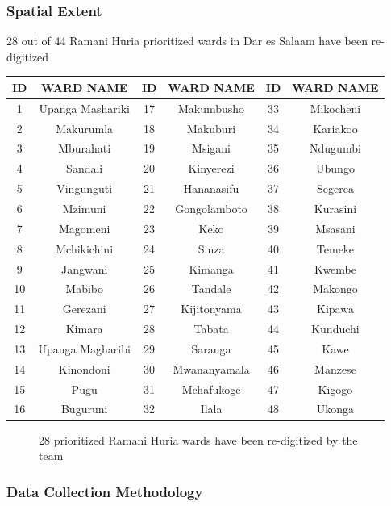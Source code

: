 \documentclass[a4paper,12pt,twoside]{article}
\begin{document}
\subsubsection{Spatial Extent}
28 out of 44 Ramani Huria prioritized wards in Dar es Salaam have been re-digitized

\begin{center}
\begin{tabular}{|c|c|c|c|c|c|}
\hline
ID & WARD NAME & ID & WARD NAME & ID & WARD NAME\\
\hline
1 & Upanga Mashariki & 17  & Makumbusho & 33  & Mikocheni\\
2 &  Makurumla & 18 &  Makuburi & 34  & Kariakoo\\
3 &  Mburahati & 19  & Msigani & 35  & Ndugumbi\\
4 &  Sandali & 20  & Kinyerezi & 36  & Ubungo\\
5  & Vingunguti & 21  & Hananasifu & 37  & Segerea\\
6 &  Mzimuni & 22  & Gongolamboto & 38  & Kurasini\\
7  & Magomeni & 23  & Keko & 39  & Msasani\\
8  & Mchikichini & 24  & Sinza & 40  & Temeke\\
9  & Jangwani & 25  & Kimanga & 41  & Kwembe\\
10  & Mabibo & 26  & Tandale & 42  & Makongo\\
11  & Gerezani & 27  & Kijitonyama & 43  & Kipawa\\
12  & Kimara & 28  & Tabata & 44  & Kunduchi\\
13 &  Upanga Magharibi & 29  & Saranga & 45  & Kawe\\
14 &  Kinondoni & 30  & Mwananyamala & 46  & Manzese\\
15 &  Pugu & 31  & Mchafukoge & 47  & Kigogo\\
16 &  Buguruni & 32  & Ilala & 48  & Ukonga\\
 \hline
\end{tabular}
\end{center}

\begin{figure}[h]
  \caption{28 prioritized Ramani Huria wards have been re-digitized by the team}
  \centering
\end{figure}

\subsubsection{Data Collection Methodology}
\end{document}
